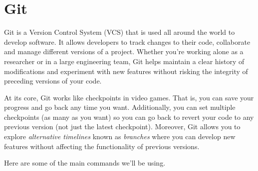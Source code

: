 \documentclass[12pt]{article}
\begin{document}
\section{Git}
Git is a Version Control System (VCS) that is used all around the world to
develop software. It allows developers to track changes to their code,
collaborate and manage different versions of a project. Whether you're working
alone as a researcher or in a large engineering team, Git helps maintain a
clear history of modifications and experiment with new features without risking
the integrity of preceding versions of your code.

At its core, Git works like checkpoints in video games. That is, you can save
your progress and go back any time you want. Additionally, you can set multiple
checkpoints (as many as you want) so you can go back to revert your code to any
previous version (not just the latest checkpoint). Moreover, Git allows you to
explore \textit{alternative timelines} known as \textit{branches} where you can
develop new features without affecting the functionality of previous versions.

Here are some of the main commands we'll be using.
\end{document}
